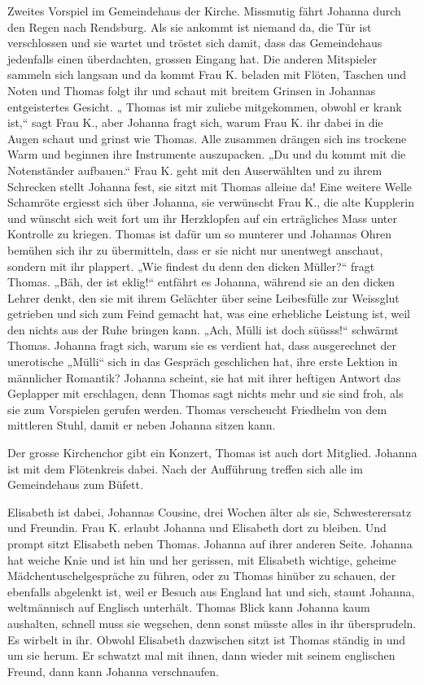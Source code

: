 \documentclass[10pt,a5paper]{book}
\begin{document}
 Zweites Vorspiel im Gemeindehaus der Kirche. Missmutig fährt Johanna durch den Regen nach Rendsburg. Als sie ankommt ist niemand da, die Tür ist verschlossen und sie wartet und tröstet sich damit, dass das Gemeindehaus jedenfalls einen überdachten, grossen Eingang hat. Die anderen Mitspieler sammeln sich langsam und da kommt Frau K. beladen mit  Flöten, Taschen und Noten und Thomas folgt ihr und schaut mit breitem Grinsen in Johannas entgeistertes Gesicht. „ Thomas ist mir zuliebe mitgekommen, obwohl er krank ist,“ sagt Frau K., aber Johanna fragt sich, warum Frau K.  ihr dabei in die Augen schaut und grinst wie Thomas. Alle zusammen drängen sich ins trockene Warm und beginnen ihre Instrumente auszupacken. „Du und du kommt mit die Notenständer aufbauen.“ Frau K. geht mit den Auserwählten und zu ihrem Schrecken stellt Johanna fest, sie sitzt mit Thomas alleine da! Eine weitere Welle Schamröte ergiesst sich über Johanna, sie verwünscht Frau K., die alte Kupplerin und wünscht sich weit fort um ihr Herzklopfen auf ein erträgliches Mass unter Kontrolle zu kriegen. Thomas ist dafür um so munterer und Johannas Ohren bemühen sich ihr zu übermitteln, dass er sie nicht nur unentwegt anschaut, sondern mit ihr plappert. „Wie findest du denn den dicken Müller?“ fragt Thomas. „Bäh, der ist eklig!“ entfährt es Johanna, während sie an den dicken Lehrer denkt, den sie mit ihrem Gelächter über seine Leibesfülle zur Weissglut getrieben und sich zum Feind gemacht hat, was eine erhebliche Leistung ist, weil den nichts aus der Ruhe bringen kann. „Ach, Mülli ist doch süüsss!“ schwärmt Thomas. Johanna fragt sich, warum sie es verdient hat, dass ausgerechnet der unerotische „Mülli“ sich in das Gespräch geschlichen hat, ihre erste Lektion in männlicher Romantik? Johanna scheint, sie hat mit ihrer heftigen Antwort das Geplapper mit erschlagen, denn Thomas sagt nichts mehr  und sie sind froh, als sie zum Vorspielen gerufen werden. Thomas verscheucht Friedhelm von dem mittleren Stuhl, damit er neben Johanna sitzen kann.
 
Der grosse Kirchenchor gibt ein Konzert, Thomas ist auch dort Mitglied. Johanna ist mit dem Flötenkreis dabei. Nach der Aufführung treffen sich alle im Gemeindehaus zum Büfett.

 Elisabeth ist dabei,  Johannas Cousine, drei Wochen älter als sie, Schwesterersatz und Freundin. Frau K. erlaubt Johanna und Elisabeth dort zu bleiben. Und prompt sitzt Elisabeth neben Thomas. Johanna auf ihrer anderen Seite. Johanna hat weiche Knie und ist hin und her gerissen, mit Elisabeth wichtige, geheime Mädchentuschelgespräche zu führen, oder zu Thomas hinüber zu schauen, der ebenfalls abgelenkt ist, weil er Besuch aus England hat und sich, staunt Johanna, weltmännisch auf Englisch unterhält. 
Thomas Blick kann Johanna kaum aushalten, schnell muss sie wegsehen, denn sonst müsste alles in ihr übersprudeln. Es wirbelt in ihr. Obwohl Elisabeth dazwischen sitzt ist Thomas ständig in und um sie herum. Er schwatzt mal mit ihnen, dann wieder mit seinem englischen Freund, dann kann Johanna verschnaufen. 
\end{document}
